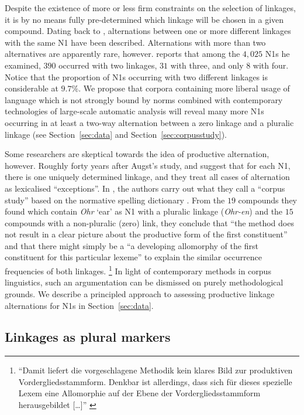 Despite the existence of more or less firm constraints on the selection of linkages, it is by no means fully pre-determined which linkage will be chosen in a given compound.
Dating back to \textcite{Augst1975}, alternations between one or more different linkages with the same N1 have been described.
Alternations with more than two alternatives are apparently rare, however.
\textcite[134--135]{Augst1975} reports that among the $4,025$ N1s he examined, $390$ occurred with two linkages, $31$ with three, and only $8$ with four.
Notice that the proportion of N1s occurring with two different linkages is considerable at $9.7\%$.
We propose that corpora containing more liberal usage of language which is not strongly bound by norms combined with contemporary technologies of large-scale automatic analysis will reveal many more N1s occurring in at least a two-way alternation between a zero linkage and a pluralic linkage (see Section~\ref{sec:data} and Section~\ref{sec:corpusstudy}).

Some researchers are skeptical towards the idea of productive alternation, however.
Roughly forty years after Augst's study, \textcite[31]{NeefBorgwaldt2012} and \textcite[46]{Neef2015} suggest that for each N1, there is one uniquely determined linkage, and they treat all cases of alternation as lexicalised ``exceptions''.
In \textcite[42]{NeefBorgwaldt2012}, the authors carry out what they call a ``corpus study'' based on the normative spelling dictionary \textcite{Duden2006}.
From the $19$ compounds they found which contain \textit{Ohr} `ear' as N1 with a pluralic linkage (\textit{Ohr-en}) and the $15$ compounds with a non-pluralic (zero) link, they conclude that ``the method does not result in a clear picture about the productive form of the first constituent'' and that there might simply be a ``a developing allomorphy of the first constituent for this particular lexeme'' to explain the similar occurrence frequencies of both linkages.%
\footnote{``Damit liefert die vorgeschlagene Methodik kein klares Bild zur produktiven Vordergliedsstammform.
Denkbar ist allerdings, dass sich für dieses spezielle Lexem eine Allomorphie auf der Ebene der Vordergliedsstammform herausgebildet [\ldots]'' \parencite[31]{NeefBorgwaldt2012}}
In light of contemporary methods in corpus linguistics, such an argumentation can be dismissed on purely methodological grounds.
We describe a principled approach to assessing productive linkage alternations for N1s in Section~\ref{sec:data}.


\subsection{Linkages as plural markers}
\label{sec:linkagesaspluralmarkers}

